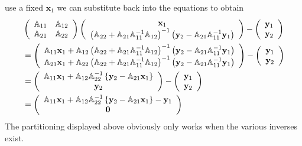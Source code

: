 \documentclass[aps,preprint]{revtex4}%
\begin{document}
use a fixed $\mathbf{x}_{1}$ we can substitute back into the equations to
obtain
\begin{align}
&  \left(
\begin{array}
[c]{cc}%
\mathbb{A}_{11} & \mathbb{A}_{12}\\
\mathbb{A}_{21} & \mathbb{A}_{22}%
\end{array}
\right)  \left(
\begin{array}
[c]{c}%
\mathbf{x}_{1}\\
\left(  \mathbb{A}_{22}+\mathbb{A}_{21}\mathbb{A}_{11}^{-1}\mathbb{A}%
_{12}\right)  ^{-1}\left(  \mathbf{y}_{2}-\mathbb{A}_{21}\mathbb{A}_{11}%
^{-1}\mathbf{y}_{1}\right)
\end{array}
\right)  -\left(
\begin{array}
[c]{c}%
\mathbf{y}_{1}\\
\mathbf{y}_{2}%
\end{array}
\right) \nonumber\\
&  =\left(
\begin{array}
[c]{c}%
\mathbb{A}_{11}\mathbf{x}_{1}+\mathbb{A}_{12}\left(  \mathbb{A}_{22}%
+\mathbb{A}_{21}\mathbb{A}_{11}^{-1}\mathbb{A}_{12}\right)  ^{-1}\left(
\mathbf{y}_{2}-\mathbb{A}_{21}\mathbb{A}_{11}^{-1}\mathbf{y}_{1}\right) \\
\mathbb{A}_{21}\mathbf{x}_{1}+\mathbb{A}_{22}\left(  \mathbb{A}_{22}%
+\mathbb{A}_{21}\mathbb{A}_{11}^{-1}\mathbb{A}_{12}\right)  ^{-1}\left(
\mathbf{y}_{2}-\mathbb{A}_{21}\mathbb{A}_{11}^{-1}\mathbf{y}_{1}\right)
\end{array}
\right)  -\left(
\begin{array}
[c]{c}%
\mathbf{y}_{1}\\
\mathbf{y}_{2}%
\end{array}
\right) \nonumber\\
&  =\left(
\begin{array}
[c]{c}%
\mathbb{A}_{11}\mathbf{x}_{1}+\mathbb{A}_{12}\mathbb{A}_{22}^{-1}\left\{
\mathbf{y}_{2}-\mathbb{A}_{21}\mathbf{x}_{1}\right\} \\
\mathbf{y}_{2}%
\end{array}
\right)  -\left(
\begin{array}
[c]{c}%
\mathbf{y}_{1}\\
\mathbf{y}_{2}%
\end{array}
\right) \nonumber\\
&  =\left(
\begin{array}
[c]{c}%
\mathbb{A}_{11}\mathbf{x}_{1}+\mathbb{A}_{12}\mathbb{A}_{22}^{-1}\left\{
\mathbf{y}_{2}-\mathbb{A}_{21}\mathbf{x}_{1}\right\}  -\mathbf{y}_{1}\\
\mathbf{0}%
\end{array}
\right)  \label{baksub2}%
\end{align}
The partitioning displayed above obviously only works when the various
inverses exist.
\end{document}

